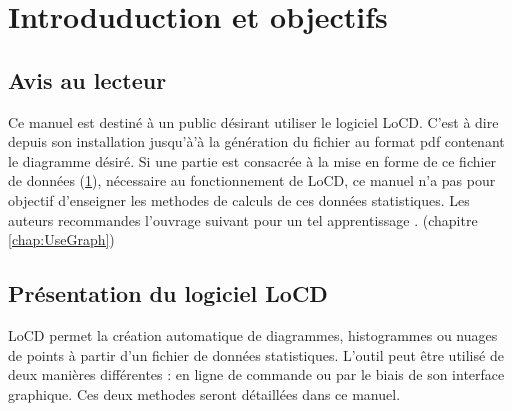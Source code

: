 \chapter{Introduduction et objectifs}\label{chap:fichDonnees}
\section{Avis au lecteur} 
Ce manuel est destiné à un public désirant utiliser le logiciel LoCD. C'est à dire depuis son installation jusqu'à'à la génération du fichier au format pdf contenant le diagramme désiré. Si une partie est consacrée à la mise en forme de ce fichier de données (\ref{chap:fichDonnees}), nécessaire au fonctionnement de LoCD, ce manuel n'a pas pour objectif d'enseigner les methodes de calculs de ces données statistiques. Les auteurs recommandes l'ouvrage suivant pour un tel apprentissage \cite{stat}. 
(chapitre \ref{chap:UseGraph}) 
\section{Présentation du logiciel LoCD}
LoCD permet la création automatique de diagrammes, histogrammes ou nuages de points à partir d'un fichier de données statistiques.  L'outil peut être utilisé de deux manières différentes : en ligne de commande ou par le biais de son interface graphique. Ces deux methodes seront détaillées dans ce manuel. 
